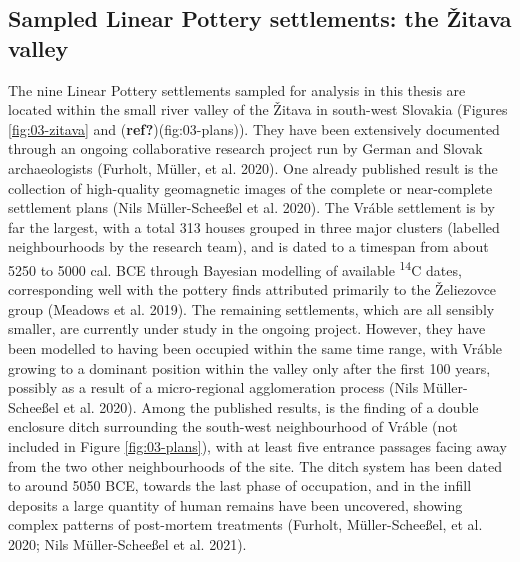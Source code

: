 \documentclass[
  12pt,
  a4paper, twoside]{book}
\begin{document}
\hypertarget{sampled-linear-pottery-settlements-the-ux17eitava-valley}{%
\subsection{Sampled Linear Pottery settlements: the Žitava valley}\label{sampled-linear-pottery-settlements-the-ux17eitava-valley}}

The nine Linear Pottery settlements sampled for analysis in this thesis are located within the small river valley of the Žitava in south-west Slovakia (Figures \ref{fig:03-zitava} and (\textbf{ref?})(fig:03-plans)). They have been extensively documented through an ongoing collaborative research project run by German and Slovak archaeologists (Furholt, Müller, et al. 2020). One already published result is the collection of high-quality geomagnetic images of the complete or near-complete settlement plans (Nils Müller-Scheeßel et al. 2020). The Vráble settlement is by far the largest, with a total 313 houses grouped in three major clusters (labelled neighbourhoods by the research team), and is dated to a timespan from about 5250 to 5000 cal. BCE through Bayesian modelling of available \textsuperscript{14}C dates, corresponding well with the pottery finds attributed primarily to the Želiezovce group (Meadows et al. 2019). The remaining settlements, which are all sensibly smaller, are currently under study in the ongoing project. However, they have been modelled to having been occupied within the same time range, with Vráble growing to a dominant position within the valley only after the first 100 years, possibly as a result of a micro-regional agglomeration process (Nils Müller-Scheeßel et al. 2020). Among the published results, is the finding of a double enclosure ditch surrounding the south-west neighbourhood of Vráble (not included in Figure \ref{fig:03-plans}), with at least five entrance passages facing away from the two other neighbourhoods of the site. The ditch system has been dated to around 5050 BCE, towards the last phase of occupation, and in the infill deposits a large quantity of human remains have been uncovered, showing complex patterns of post-mortem treatments (Furholt, Müller-Scheeßel, et al. 2020; Nils Müller-Scheeßel et al. 2021).
\end{document}
